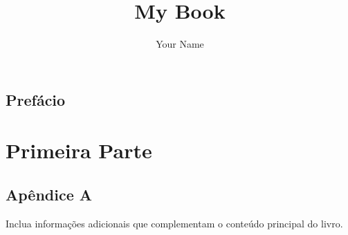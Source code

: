\documentclass{book}
\begin{document}
\frontmatter %

\title{My Book}
\author{Your Name}

\maketitle{}

\tableofcontents{}

\chapter{Prefácio}

\mainmatter %

\part{Primeira Parte}






\backmatter %

\appendix %

\chapter{Apêndice A}
Inclua informações adicionais que complementam o conteúdo principal do livro.


\printindex %
\end{document}
